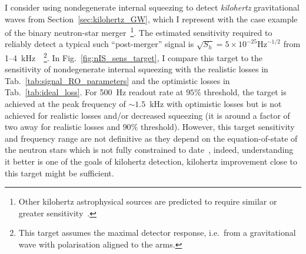 I consider using nondegenerate internal squeezing to detect \emph{kilohertz} gravitational waves from Section~\ref{sec:kilohertz_GW}, which I represent with the case example of the binary neutron-star merger~\footnote{Other kilohertz astrophysical sources are predicted to require similar or greater sensitivity~\cite{miaoDesignGravitationalWaveDetectors2018}.}. The estimated sensitivity required to reliably detect a typical such ``post-merger'' signal is $\sqrt{S_h}=5\times10^{-25} \mathrm{Hz}^{-1/2}$ from 1--4~kHz~\cite{miaoDesignGravitationalWaveDetectors2018}~\footnote{This target assumes the maximal detector response, i.e.\ from a gravitational wave with polarisation aligned to the arms.}.
In Fig.~\ref{fig:nIS_sens_target}, I compare this target to the sensitivity of nondegenerate internal squeezing with the realistic losses in Tab.~\ref{tab:signal_RO_parameters} and the optimistic losses in Tab.~\ref{tab:ideal_loss}. 
For 500~Hz readout rate at $95\%$ threshold, the target is achieved at the peak frequency of $\sim1.5$~kHz with optimistic losses but is not achieved for realistic losses and/or decreased squeezing (it is around a factor of two away for realistic losses and $90\%$ threshold). %
However, this target sensitivity and frequency range are not definitive as they depend on the equation-of-state of the neutron stars which is not fully constrained to date~\cite{PhysRevD.100.104029,miaoDesignGravitationalWaveDetectors2018}, indeed, understanding it better is one of the goals of kilohertz detection, kilohertz improvement close to this target might be sufficient.
